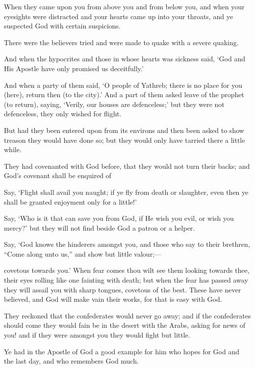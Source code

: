 \documentclass[fontsize=14pt, letterpaper, notitlepage, openany, DIV=12]{scrbook} %
\begin{document}
\noindent[33:10]
When they came upon you from above you and from below you, and when your
eyesights were distracted and your hearts came up into your throats, and ye suspected God with
certain suspicions.

\noindent[33:11]
There were the believers tried and were made to quake with a severe quaking.

\noindent[33:12]
And when the hypocrites and those in whose hearts was sickness said, `God and His
Apostle have only promised us deceitfully.'

\noindent[33:13]
And when a party of them said, `O people of Yathreb; there is no place for you (here),
return then (to the city).' And a part of them asked leave of the prophet (to return), saying,
`Verily, our houses are defenceless;' but they were not defenceless, they only wished for flight.

\noindent[33:14]
But had they been entered upon from its environs and then been asked to show treason
they would have done so; but they would only have tarried there a little while.

\noindent[33:15]
They had covenanted with God before, that they would not turn their backs; and God's
covenant shall be enquired of

\noindent[33:16]
Say, `Flight shall avail you naught; if ye fly from death or slaughter, even then ye shall be
granted enjoyment only for a little!'

\noindent[33:17]
Say, `Who is it that can save you from God, if He wish you evil, or wish you mercy?' but
they will not find beside God a patron or a helper.

\noindent[33:18]
Say, `God knows the hinderers amongst you, and those who say to their brethren, ``Come
along unto us,'' and show but little valour;---

\noindent[33:19]
covetous towards you.' When fear comes thou wilt see them looking towards thee, their
eyes rolling like one fainting with death; but when the fear has passed away they will assail you
with sharp tongues, covetous of the best. These have never believed, and God will make vain
their works, for that is easy with God.

\noindent[33:20]
They reckoned that the confederates would never go away; and if the confederates should
come they would fain be in the desert with the Arabs, asking for news of you! and if they were
amongst you they would fight but little.

\noindent[33:21]
Ye had in the Apostle of God a good example for him who hopes for God and the last
day, and who remembers God much.
\end{document}
